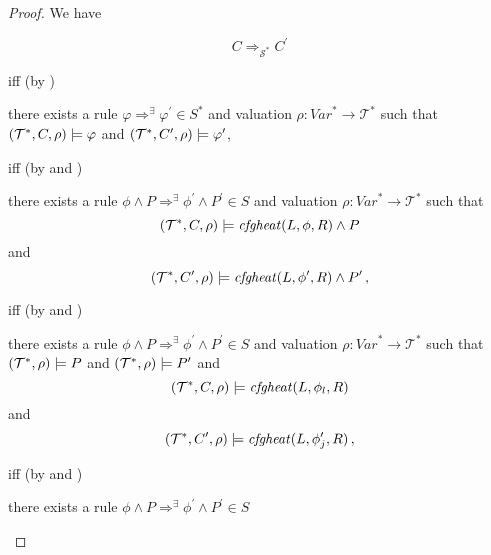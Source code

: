 \begin{proof}
We have
\begin{proofenv}
    \begin{equation*}
        C \Rightarrow_{\mathcal{S}^*} C^\prime
    \end{equation*}
\end{proofenv}
iff (by )
\begin{proofenv}
    there exists a rule $\varphi \Rightarrow^\exists \varphi^\prime \in S^*$
    and valuation $\rho : \mathit{Var}^* \to \mathcal{T}^*$ such that
    $(\mathcal{T}^*, C, \rho) \models \varphi$
    and $(\mathcal{T}^*, C^\prime, \rho) \models \varphi^\prime$,
\end{proofenv}
iff (by
 and )
\begin{proofenv}
    there exists a rule $\phi \land P \Rightarrow^\exists \phi^\prime \land P^\prime \in S$
    and valuation $\rho : \mathit{Var}^* \to \mathcal{T}^*$ such that
    \begin{equation*}
    (\mathcal{T}^*, C, \rho) \models \mathit{cfgheat}(L, \phi, R) \land P
    \end{equation*}
    and
    \begin{equation*}
        (\mathcal{T}^*, C^\prime, \rho) \models
        \mathit{cfgheat}(L, \phi^\prime, R) \land P^\prime \, ,
    \end{equation*}
\end{proofenv}
iff (by  and )
\begin{proofenv}
    there exists a rule $\phi \land P \Rightarrow^\exists \phi^\prime \land P^\prime \in S$
    and valuation $\rho : \mathit{Var}^* \to \mathcal{T}^*$ such that
    $(\mathcal{T}^*, \rho) \models P$ and $(\mathcal{T}^*, \rho) \models P^\prime$ and
    \begin{equation*}
        (\mathcal{T}^*, C, \rho) \models \mathit{cfgheat}(L, \phi_l, R)
    \end{equation*}
    and
    \begin{equation*}
        (\mathcal{T}^*, C^\prime, \rho) \models
        \mathit{cfgheat}(L, \phi^\prime_j, R) \, ,
    \end{equation*}
\end{proofenv}
iff (by  and )
\begin{proofenv}
    there exists a rule $\phi \land P \Rightarrow^\exists \phi^\prime \land P^\prime \in S$

\end{proofenv}
\end{proof}
